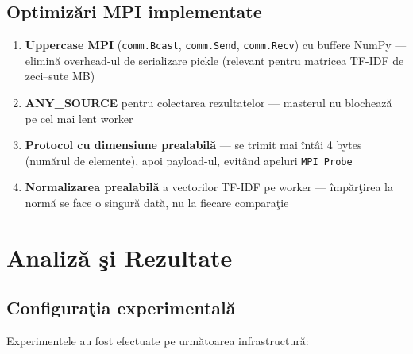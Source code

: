 \documentclass[a4paper,12pt]{report}
\begin{document}
\section{Optimiz\u{a}ri MPI implementate}

\begin{enumerate}
  \item \textbf{Uppercase MPI} (\texttt{comm.Bcast}, \texttt{comm.Send}, \texttt{comm.Recv}) cu buffere NumPy — elimin\u{a} overhead-ul de serializare pickle (relevant pentru matricea TF-IDF de zeci--sute MB)
  \item \textbf{ANY\_SOURCE} pentru colectarea rezultatelor — masterul nu blocheaz\u{a} pe cel mai lent worker
  \item \textbf{Protocol cu dimensiune prealabil\u{a}} — se trimit mai \^{i}nt\^{a}i 4 bytes (num\u{a}rul de elemente), apoi payload-ul, evit\^{a}nd apeluri \texttt{MPI\_Probe}
  \item \textbf{Normalizarea prealabil\u{a}} a vectorilor TF-IDF pe worker — \^{i}mp\u{a}r\c{t}irea la norm\u{a} se face o singur\u{a} dat\u{a}, nu la fiecare compara\c{t}ie
\end{enumerate}

\chapter{Analiz\u{a} \c{s}i Rezultate}

\section{Configura\c{t}ia experimental\u{a}}

Experimentele au fost efectuate pe urm\u{a}toarea infrastructur\u{a}:
\end{document}
